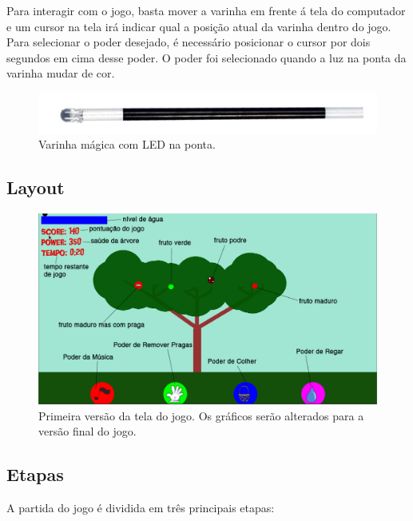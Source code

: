 \documentclass[12pt]{article}
\begin{document}
 Para interagir com o jogo, basta mover a varinha em frente \'a tela do computador e um cursor na tela ir\'a indicar qual a posi\c c\~ao
 atual da varinha dentro do jogo. Para selecionar o poder desejado, \'e necess\'ario posicionar o cursor por dois segundos em cima desse poder.
 O poder foi selecionado quando a luz na ponta da varinha mudar de cor. 

	\begin{figure}[ht!]
	\begin{center}
		\includegraphics[scale=0.5]{img/varinha.png}
		\footnotesize \caption{Varinha m\'agica com LED na ponta.}
	\end{center}
	\end{figure}	

\subsection{Layout}

	\begin{figure}[ht!]
	\begin{center}
		\includegraphics[scale=0.3]{img/tela_jogo.png}
		\footnotesize \caption{Primeira vers\~ao da tela do jogo. Os gr\'aficos ser\~ao alterados para a vers\~ao final do jogo.}
	\end{center}
	\end{figure}	

\subsection{Etapas}
A partida do jogo \'e dividida em tr\^es principais etapas: 
\end{document}

